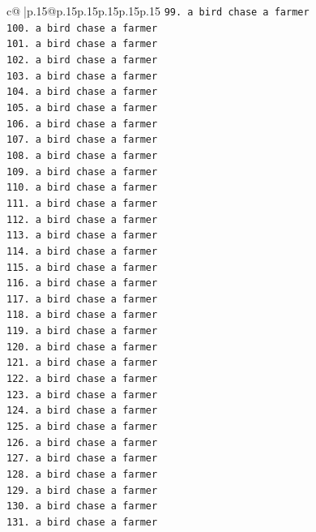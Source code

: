 \documentclass{article}
\begin{document}
{\begin{supertabular}{c@{$\;$}|p{.15\linewidth}@{}p{.15\linewidth}p{.15\linewidth}p{.15\linewidth}p{.15\linewidth}p{.15\linewidth}}
{{{\texttt{99. a bird chase a farmer} \\
\texttt{100. a bird chase a farmer} \\
\texttt{101. a bird chase a farmer} \\
\texttt{102. a bird chase a farmer} \\
\texttt{103. a bird chase a farmer} \\
\texttt{104. a bird chase a farmer} \\
\texttt{105. a bird chase a farmer} \\
\texttt{106. a bird chase a farmer} \\
\texttt{107. a bird chase a farmer} \\
\texttt{108. a bird chase a farmer} \\
\texttt{109. a bird chase a farmer} \\
\texttt{110. a bird chase a farmer} \\
\texttt{111. a bird chase a farmer} \\
\texttt{112. a bird chase a farmer} \\
\texttt{113. a bird chase a farmer} \\
\texttt{114. a bird chase a farmer} \\
\texttt{115. a bird chase a farmer} \\
\texttt{116. a bird chase a farmer} \\
\texttt{117. a bird chase a farmer} \\
\texttt{118. a bird chase a farmer} \\
\texttt{119. a bird chase a farmer} \\
\texttt{120. a bird chase a farmer} \\
\texttt{121. a bird chase a farmer} \\
\texttt{122. a bird chase a farmer} \\
\texttt{123. a bird chase a farmer} \\
\texttt{124. a bird chase a farmer} \\
\texttt{125. a bird chase a farmer} \\
\texttt{126. a bird chase a farmer} \\
\texttt{127. a bird chase a farmer} \\
\texttt{128. a bird chase a farmer} \\
\texttt{129. a bird chase a farmer} \\
\texttt{130. a bird chase a farmer} \\
\texttt{131. a bird chase a farmer} \\
}}}
\end{supertabular}}
\end{document}
